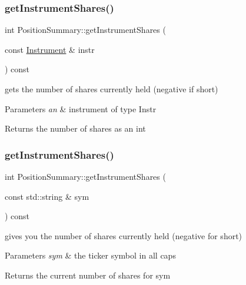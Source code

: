 \subsubsection{\texorpdfstring{get\+Instrument\+Shares()}{getInstrumentShares()}\hspace{0.1cm}{\footnotesize\ttfamily [1/2]}}
{\footnotesize\ttfamily int Position\+Summary\+::get\+Instrument\+Shares (\begin{DoxyParamCaption}\item[{const \hyperlink{classInstrument}{Instrument} \&}]{instr }\end{DoxyParamCaption}) const}



gets the number of shares currently held (negative if short) 


\begin{DoxyParams}{Parameters}
{\em an} & instrument of type Instr \\
\hline
\end{DoxyParams}
\begin{DoxyReturn}{Returns}
the number of shares as an int 
\end{DoxyReturn}
\mbox{\label{classPositionSummary_a793bab7b233e00e5110440446ba5b3be}} 
\subsubsection{\texorpdfstring{get\+Instrument\+Shares()}{getInstrumentShares()}\hspace{0.1cm}{\footnotesize\ttfamily [2/2]}}
{\footnotesize\ttfamily int Position\+Summary\+::get\+Instrument\+Shares (\begin{DoxyParamCaption}\item[{const std\+::string \&}]{sym }\end{DoxyParamCaption}) const}



gives you the number of shares currently held (negative for short) 


\begin{DoxyParams}{Parameters}
{\em sym} & the ticker symbol in all caps \\
\hline
\end{DoxyParams}
\begin{DoxyReturn}{Returns}
the current number of shares for sym 
\end{DoxyReturn}
\mbox{\label{classPositionSummary_a057618b9fbc23598a7353555ff280a44}} 
